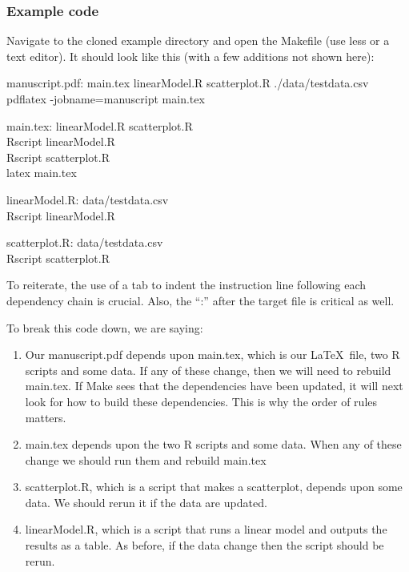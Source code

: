 \documentclass{article}
\begin{document}
\subsubsection{Example code}

Navigate to the cloned example directory and open the Makefile (use {\sf less} or a text editor). It should look like this (with a few additions not shown here): 
\newcommand\tab[1][1cm]{\hspace*{#1}}

\noindent manuscript.pdf: main.tex linearModel.R scatterplot.R ./data/testdata.csv\\
\tab pdflatex -jobname=manuscript main.tex

\noindent main.tex: linearModel.R scatterplot.R\\
\tab Rscript linearModel.R\\
\tab Rscript scatterplot.R\\
\tab latex main.tex 

\noindent linearModel.R: data/testdata.csv\\
\tab Rscript linearModel.R

\noindent scatterplot.R: data/testdata.csv\\
\tab Rscript scatterplot.R

To reiterate, the use of a tab to indent the instruction line following each dependency chain is crucial. Also, the ``:'' after the target file is critical as well.

\noindent To break this code down, we are saying:

\begin{enumerate}
\item Our manuscript.pdf depends upon main.tex, which is our \LaTeX\ file, two R scripts and some data. If any of these change, then we will need to rebuild main.tex. If {\sf Make} sees that the dependencies have been updated, it will next look for how to build these dependencies. This is why the order of rules matters.
\item main.tex depends upon the two R scripts and some data. When any of these change we should run them and rebuild main.tex
\item scatterplot.R, which is a script that makes a scatterplot, depends upon some data. We should rerun it if the data are updated.
\item linearModel.R, which is a script that runs a linear model and outputs the results as a table. As before, if the data change then the script should be rerun.
\end{enumerate}
\end{document}
